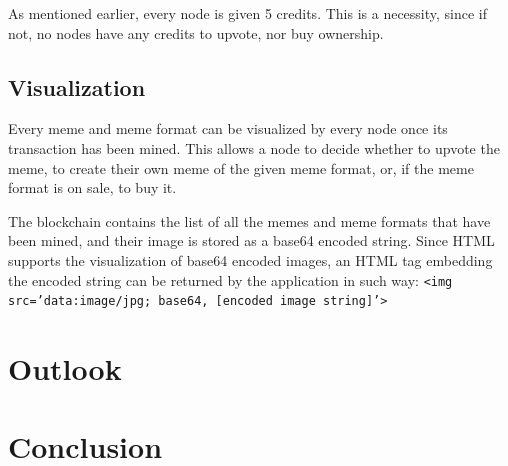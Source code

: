 \documentclass[12pt]{article}
\begin{document}
As mentioned earlier, every node is given 5 credits. This is a
necessity, since if not, no nodes have any credits to upvote, nor buy
ownership.

\subsection{Visualization} %
Every meme and meme format can be visualized by every node once its transaction has been mined. This allows a node to decide whether to upvote the meme, to create their own meme of the given meme format, or, if the meme format is on sale, to buy it.

The blockchain contains the list of all the memes and meme formats that have been mined, and their image is stored as a base64 encoded string. Since HTML supports the visualization of base64 encoded images, an HTML tag embedding the encoded string can be returned by the application in such way: {\tt <img src='data:image/jpg; base64, [encoded image string]'>}

\section{Outlook} \label{sec:Outlook} %

\section{Conclusion} \label{sec:Conclusion} %
\end{document}
